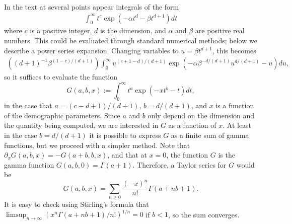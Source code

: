 \documentclass{article}
\begin{document}
In the text at several points appear integrals of the form
\begin{align}
  \int_0^\infty t^c \exp \left( - \alpha t^d - \beta t^{d+1} \right) dt 
\end{align}
where $c$ is a positive integer, $d$ is the dimension, and $\alpha$ and $\beta$ are positive real numbers.
This could be evaluated through standard numerical methods; below we describe a power series expansion.
Changing variables to $u = \beta t^{d+1}$, this becomes
\begin{align}
    \left( (d+1)^{-1} \beta^{ (1-c)/(d+1) } \right) \int_0^\infty u^{(c+1-d)/(d+1)} \exp\left( - \alpha \beta^{-d/(d+1)} u^{d/(d+1)} - u \right) du ,
\end{align}
so it suffices to evaluate the function
\begin{equation}
    G(a,b,x) := \int_0^\infty  t^a \exp\left( -x t^b - t \right) dt ,
\end{equation}
in the case that $a=(c-d+1)/(d+1)$, $b=d/(d+1)$, and $x$ is a function of the demographic parameters.
Since $a$ and $b$ only depend on the dimension and the quantity being computed,
we are interested in $G$ as a function of $x$.
At least in the case $b=d/(d+1)$ it is possible to express $G$ as a finite sum of gamma functions,
but we proceed with a simpler method.
Note that $\partial_x G(a,b,x) = -G(a+b,b,x)$,
and that at $x=0$, the function $G$ is the gamma function $G(a,b,0) = \Gamma(a+1)$.
Therefore, a Taylor series for $G$ would be
\[
    G(a,b,x) = \sum_{n \ge 0} \frac{(-x)^n}{n!} \Gamma(a+nb+1) .
\]
It is easy to check using Stirling's formula that $\limsup_{n \to \infty} ( x^n \Gamma(a+nb+1)/n! )^{1/n} = 0$
if $b<1$, so the sum converges.
\end{document}
